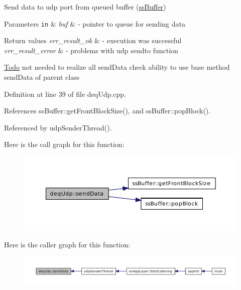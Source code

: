 Send data to udp port from queued buffer (\hyperlink{classssBuffer}{ssBuffer}) 


\begin{DoxyParams}[1]{Parameters}
\mbox{\tt in}  & {\em buf} & -\/ pointer to queue for sending data \\
\hline
\end{DoxyParams}

\begin{DoxyRetVals}{Return values}
{\em err\_\-result\_\-ok} & -\/ execution was successful \\
\hline
{\em err\_\-result\_\-error} & -\/ problems with udp sendto function \\
\hline
\end{DoxyRetVals}


\begin{Desc}
\item[\hyperlink{todo__todo000008}{Todo}]not needed to realize all sendData check ability to use base method sendData of parent class \end{Desc}




Definition at line 39 of file deqUdp.cpp.



References ssBuffer::getFrontBlockSize(), and ssBuffer::popBlock().



Referenced by udpSenderThread().



Here is the call graph for this function:\nopagebreak
\begin{figure}[H]
\begin{center}
\leavevmode
\includegraphics[width=398pt]{db/dc2/classdeqUdp_a1e50010f100ae79d810f8d4889ac361b_cgraph}
\end{center}
\end{figure}




Here is the caller graph for this function:\nopagebreak
\begin{figure}[H]
\begin{center}
\leavevmode
\includegraphics[width=400pt]{db/dc2/classdeqUdp_a1e50010f100ae79d810f8d4889ac361b_icgraph}
\end{center}
\end{figure}


